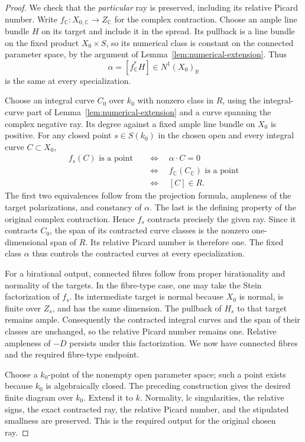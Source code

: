 \begin{proof}
We check that the \emph{particular} ray is preserved, including
its relative Picard number.  Write
$f_{\mathbb C}:X_{0,\mathbb C}\to Z_{\mathbb C}$ for the complex
contraction.  Choose an ample line bundle $H$ on its target
and include it in the spread.  Its pullback is a line bundle
on the fixed product $X_0\times S$, so its numerical class is
constant on the connected parameter space, by the argument
of Lemma~\ref{lem:numerical-extension}.  Thus
\[
 \alpha=[f_{\mathbb C}^*H]\in N^1(X_0)_{\mathbb R}
\]
is the same at every specialization.

Choose an integral curve $C_0$ over $k_0$ with nonzero class in
$R$, using the integral-curve part of
Lemma~\ref{lem:numerical-extension} and a curve spanning the
complex negative ray.  Its degree against a fixed ample line
bundle on $X_0$ is positive.  For any closed point $s\in S(k_0)$
in the chosen open and every integral curve $C\subset X_0$,
\[
 \begin{aligned}
 f_s(C)\text{ is a point}
 &\quad\Longleftrightarrow\quad \alpha\cdot C=0\\
 &\quad\Longleftrightarrow\quad
 f_{\mathbb C}(C_{\mathbb C})\text{ is a point}\\
 &\quad\Longleftrightarrow\quad [C]\in R.
 \end{aligned}
\]
The first two equivalences follow from the projection formula,
ampleness of the target polarizations, and constancy of $\alpha$.
The last is the defining property of the original complex
contraction.  Hence $f_s$ contracts precisely the given ray.
Since it contracts $C_0$, the span of its contracted curve
classes is the nonzero one-dimensional span of $R$.
Its relative Picard number is therefore one.  The fixed class
$\alpha$ thus controls the contracted curves at every specialization.

For a birational output, connected fibres follow from
proper birationality and normality of the targets.  In the
fibre-type case, one may take the Stein factorization of
$f_s$.  Its intermediate target is normal because $X_0$ is
normal, is finite over $Z_s$, and has the same dimension.
The pullback of $H_s$ to that target remains ample.  Consequently
the contracted integral curves and the span of their classes
are unchanged, so the relative Picard number remains one.
Relative ampleness of $-D$ persists under this
factorization.  We now have connected fibres and the required
fibre-type endpoint.

Choose a $k_0$-point of the nonempty open parameter space;
such a point exists because $k_0$ is algebraically closed.
The preceding construction gives the desired finite diagram
over $k_0$.  Extend it to $k$.  Normality, lc singularities,
the relative signs, the exact contracted ray, the relative
Picard number, and the stipulated smallness are preserved.
This is the required output for the original chosen ray.
\end{proof}

